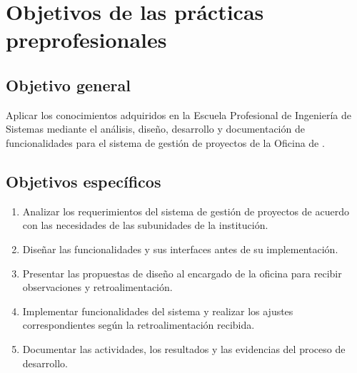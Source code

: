 \section{Objetivos de las prácticas preprofesionales}
\subsection{Objetivo general}
Aplicar los conocimientos adquiridos en la Escuela Profesional de Ingeniería de Sistemas mediante el análisis, diseño, desarrollo y documentación de funcionalidades para el sistema de gestión de proyectos de la Oficina de \InstitucionNombre.

\subsection{Objetivos específicos}
\begin{enumerate}
    \item Analizar los requerimientos del sistema de gestión de proyectos de acuerdo con las necesidades de las subunidades de la institución.
    \item Diseñar las funcionalidades y sus interfaces antes de su implementación.
    \item Presentar las propuestas de diseño al encargado de la oficina para recibir observaciones y retroalimentación.
    \item Implementar funcionalidades del sistema y realizar los ajustes correspondientes según la retroalimentación recibida.
    \item Documentar las actividades, los resultados y las evidencias del proceso de desarrollo.
\end{enumerate}
